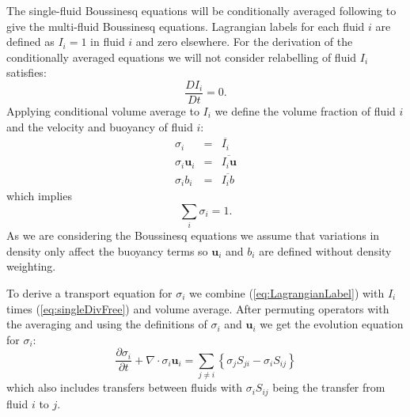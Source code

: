\documentclass[draft]{agujournal2019}
\begin{document}
The single-fluid Boussinesq equations will be conditionally averaged following  to give the multi-fluid Boussinesq equations. Lagrangian labels for each fluid $i$ are defined as $I_i=1$ in fluid $i$ and zero elsewhere. 
For the derivation of the conditionally averaged equations we will not consider relabelling of fluid  $I_i$ satisfies:
\begin{equation}
\frac{DI_i}{Dt}=0.
\label{eq:LagrangianLabel}
\end{equation}
Applying conditional volume average to $I_i$ we define the volume fraction of fluid $i$ and the velocity and buoyancy of fluid $i$:
\begin{eqnarray}
\sigma_i &=& \overline{I_i} \\
\sigma_i \mathbf{u}_i &=& \overline{I_i \mathbf{u}} \\
\sigma_i b_i &=& \overline{I_i b}
\label{eq:defineFluidFields}
\end{eqnarray}
which implies
\begin{equation}
\sum_{i}\sigma_{i}  =  1.
\label{eq:sumOne}
\end{equation}
As we are considering the Boussinesq equations we assume that variations in density only affect the buoyancy terms so $\mathbf{u}_i$ and $b_i$ are defined without density weighting. 

To derive a transport equation for $\sigma_i$ we combine (\ref{eq:LagrangianLabel}) with $I_i$ times (\ref{eq:singleDivFree}) and volume average. After permuting operators with the averaging \cite<as described by>{TWV+18} and using the definitions of $\sigma_i$ and $\mathbf{u}_i$ we get the evolution equation for $\sigma_i$:
\begin{equation}
\frac{\partial\sigma_{i}}{\partial t}+\nabla\cdot\sigma_{i}\mathbf{u}_{i}  =  \sum_{j\ne i}\left\{ \sigma_{j}S_{ji}-\sigma_{i}S_{ij}\right\}
\label{eq:sigma}
\end{equation}
which also includes transfers between fluids with $\sigma_{i}S_{ij}$ being the transfer from fluid $i$ to $j$.
\end{document}

